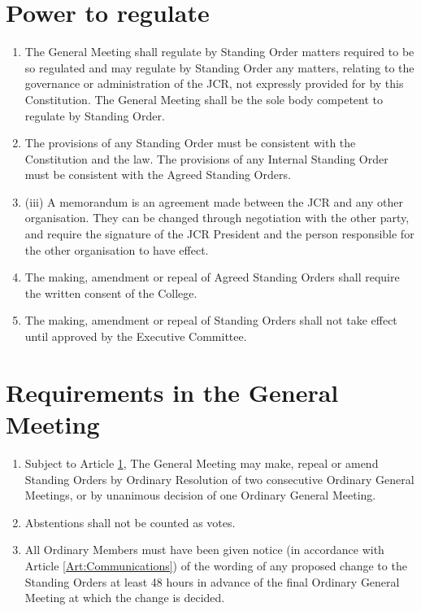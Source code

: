 \documentclass[11pt,a4paper, oneside]{memoir}
\begin{document}
	\section{Power to regulate} \label{Art:SOPowers}
	\begin{enumerate}
		\item The General Meeting shall regulate by Standing Order matters required to be so regulated and may regulate by Standing Order any matters, relating to the governance or administration of the JCR, not expressly provided for by this Constitution.
		The General Meeting shall be the sole body competent to regulate by Standing Order.
		\item The provisions of any Standing Order must be consistent with the Constitution and the law.
		The provisions of any Internal Standing Order must be consistent with the Agreed Standing Orders.
		\item (iii)	A memorandum is an agreement made between the JCR and any other organisation. They can be changed through negotiation with the other party, and require the signature of the JCR President and the person responsible for the other organisation to have effect.
		\item The making, amendment or repeal of Agreed Standing Orders shall require the written consent of the College.
		\item The making, amendment or repeal of Standing Orders shall not take effect until approved by the Executive Committee.
	\end{enumerate}
	\section{Requirements in the General Meeting}
	\begin{enumerate} \label{Art:SORequirements}
		\item Subject to Article \ref{Art:SOPowers}, The General Meeting may make, repeal or amend Standing Orders by Ordinary Resolution of two consecutive Ordinary General Meetings, or by unanimous decision of one Ordinary General Meeting. 
		\item Abstentions shall not be counted as votes.
		\item All Ordinary Members must have been given notice (in accordance with Article \ref{Art:Communications}) of the wording of any proposed change to the Standing Orders at least 48 hours in advance of the final Ordinary General Meeting at which the change is decided.
	\end{enumerate}
\end{document}
